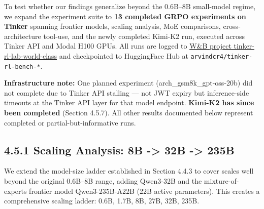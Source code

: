\documentclass[
  american,
  11pt,
  a4paper,
  oneside]{report}
\begin{document}
To test whether our findings generalize beyond the 0.6B--8B small-model
regime, we expand the experiment suite to \textbf{13 completed GRPO
experiments on Tinker} spanning frontier models, scaling analysis, MoE
comparisons, cross-architecture tool-use, and the newly completed
Kimi-K2 run, executed across Tinker API and Modal H100 GPUs. All runs
are logged to
\href{https://wandb.ai/arvindcr4-pes-university/tinker-rl-lab-world-class}{W\&B
project tinker-rl-lab-world-class} and checkpointed to HuggingFace Hub
at \texttt{arvindcr4/tinker-rl-bench-*}.

\textbf{Infrastructure note:} One planned experiment
(arch\_gsm8k\_gpt-oss-20b) did not complete due to Tinker API stalling
--- not JWT expiry but inference-side timeouts at the Tinker API layer
for that model endpoint. \textbf{Kimi-K2 has since been completed}
(Section 4.5.7). All other results documented below represent completed
or partial-but-informative runs.

\subsection{4.5.1 Scaling Analysis: 8B -\textgreater{} 32B
-\textgreater{} 235B}\label{scaling-analysis-8b---32b---235b}

We extend the model-size ladder established in Section 4.4.3 to cover
scales well beyond the original 0.6B--8B range, adding Qwen3-32B and the
mixture-of-experts frontier model Qwen3-235B-A22B (22B active
parameters). This creates a comprehensive scaling ladder: 0.6B, 1.7B,
8B, 27B, 32B, 235B.
\end{document}
